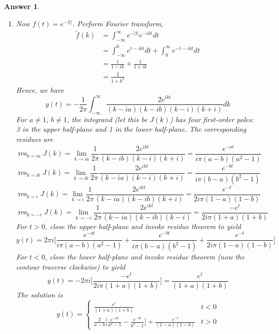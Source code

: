 \documentclass[a4paper]{article}
\DeclareMathOperator{\res}{res}
\newtheorem{ans}{Answer}[section]
\theoremstyle{new}
\begin{document}
\begin{ans}
\begin{enumerate}[label=(\roman*)]
So the Green's function $G(t)$ is
$$G(t)=
\left\{
        \begin{array}{ll}
      0& t<0 \\
      \frac{e^{-at}-e^{-bt}}{b-a} & t>0
      \end{array}
    \right.$$
\item Now $f(t)=e^{-|t|}$. Perform Fourier transform,
\begin{align}
    \tilde{f}(k)&=\int_{-\infty}^\infty e^{-|t|}e^{-ikt}dt\nonumber\\&=\int_{-\infty}^0 e^{t-ikt}dt+\int_0^\infty e^{-t-ikt}dt\nonumber\\&=\frac{1}{1-ik}+\frac{1}{1+ik}\nonumber\\&=\frac{2}{1+k^2}\nonumber
\end{align}
Hence, we have
$$y(t)=-\frac{1}{2\pi}\int_{-\infty}^\infty\frac{2e^{ikt}}{(k-ia)(k-ib)(k-i)(k+i)}dk$$
For $a\neq 1$, $b\neq 1$, the integrand (let this be $J(k)$) has four first-order poles: 3 in the upper half-plane and 1 in the lower half-plane. The corresponding residues are
$$\res_{k=ia}J(k)=\lim_{k\rightarrow ia}\frac{1}{2\pi}\frac{2e^{ikt}}{(k-ib)(k-i)(k+i)}=\frac{e^{-at}}{i\pi(a-b)(a^2-1)}$$
$$\res_{k=ib}J(k)=\lim_{k\rightarrow ib}\frac{1}{2\pi}\frac{2e^{ikt}}{(k-ia)(k-i)(k+i)}=\frac{e^{-bt}}{i\pi(b-a)(b^2-1)}$$
$$\res_{k=i}J(k)=\lim_{k\rightarrow i}\frac{1}{2\pi}\frac{2e^{ikt}}{(k-ia)(k-ib)(k+i)}=\frac{e^{-t}}{2i\pi(1-a)(1-b)}$$
$$\res_{k=-i}J(k)=\lim_{k\rightarrow -i}\frac{1}{2\pi}\frac{2e^{ikt}}{(k-ia)(k-ib)(k-i)}=\frac{-e^{t}}{2i\pi(1+a)(1+b)}$$
For $t>0$, close the upper half-plane and invoke residue theorem to yield
$$y(t)=2\pi i\bigg[\frac{e^{-at}}{i\pi(a-b)(a^2-1)}+\frac{e^{-bt}}{i\pi(b-a)(b^2-1)}+\frac{e^{-t}}{2i\pi(1-a)(1-b)}\bigg]$$
For $t<0$, close the lower half-plane and invoke residue theorem (now the contour traverse clockwise) to yield
$$y(t)=-2\pi i\bigg[\frac{-e^t}{2i\pi(1+a)(1+b)}\bigg]=\frac{e^t}{(1+a)(1+b)}$$
The solution is
$$y(t)=
\left\{
        \begin{array}{ll}
      \frac{e^t}{(1+a)(1+b)}& t<0 \\
      \frac{2}{a-b}\bigg[\frac{e^{-at}}{a^2-1}-\frac{e^{-bt}}{b^2-1}\bigg]+\frac{e^{-t}}{(1-a)(1-b)}& t>0
        \end{array}
    \right.$$
\end{enumerate}
\end{ans}
\newpage
\end{document}
